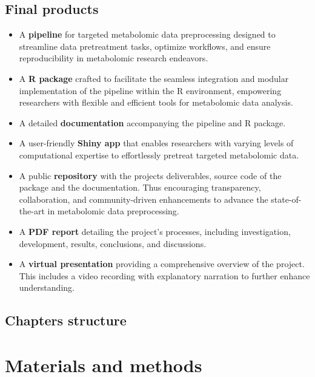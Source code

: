 \documentclass[ENG, BIB]{TFUOC}%
\begin{document}
\section{Final products}
\begin{itemize}
    \item A \textbf{pipeline} for targeted metabolomic data preprocessing designed to streamline data pretreatment tasks, optimize workflows, and ensure reproducibility in metabolomic research endeavors.
    \item A \textbf{R package} crafted to facilitate the seamless integration and modular implementation of the pipeline within the R environment, empowering researchers with flexible and efficient tools for metabolomic data analysis.
    \item A detailed \textbf{documentation} accompanying the pipeline and R package.
    \item A user-friendly \textbf{Shiny app} that enables researchers with varying levels of computational expertise to effortlessly pretreat targeted metabolomic data.
    \item A public \textbf{repository} with the projects deliverables, source code of the package and the documentation. Thus encouraging transparency, collaboration, and community-driven enhancements to advance the state-of-the-art in metabolomic data preprocessing.
    \item A \textbf{PDF report} detailing the project's processes, including investigation, development, results, conclusions, and discussions.
    \item A \textbf{virtual presentation} providing a comprehensive overview of the project. This includes a video recording with explanatory narration to further enhance understanding.
\end{itemize}

\section{Chapters structure} 

 



\chapter{Materials and methods}
\end{document}
